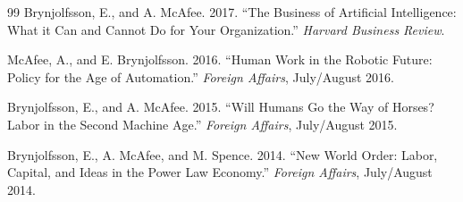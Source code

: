 \documentclass[11pt]{article}
\begin{document}
\begin{thebibliography}{99}
Brynjolfsson, E., and A. McAfee. 2017.
\newblock ``The Business of Artificial Intelligence: What it Can and Cannot Do for Your Organization.''
\newblock \emph{Harvard Business Review}.

McAfee, A., and E. Brynjolfsson. 2016.
\newblock ``Human Work in the Robotic Future: Policy for the Age of Automation.''
\newblock \emph{Foreign Affairs}, July/August 2016.

Brynjolfsson, E., and A. McAfee. 2015.
\newblock ``Will Humans Go the Way of Horses? Labor in the Second Machine Age.''
\newblock \emph{Foreign Affairs}, July/August 2015.

Brynjolfsson, E., A. McAfee, and M. Spence. 2014.
\newblock ``New World Order: Labor, Capital, and Ideas in the Power Law Economy.''
\newblock \emph{Foreign Affairs}, July/August 2014.

\end{thebibliography}
\end{document}
